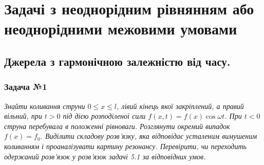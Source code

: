 \documentclass[a4paper, 14pt]{extreport}
\begin{document}
\section{Задачі з неоднорідним рівнянням або неоднорідними межовими умовами}

\subsection{Джерела з гармонічною залежністю від часу.}

\subsubsection{Задача №1}

\textit{Знайти коливання струни $0 \leq x \leq l$, лівий кінець якої закріплений, а правий вільний, при $t > 0$ під дією розподіленої сили $f(x,t) = f(x)\cos\omega t$. При $t < 0$ струна перебувала в положенні рівноваги. Розглянути окремий випадок $f(x) = f_0$. Виділити складову розв’язку, яка відповідає усталеним вимушеним коливанням і проаналізувати картину резонансу. Перевірити, чи переходить одержаний розв’язок у розв’язок задачі 5.1 за відповідних умов.}
\end{document}
